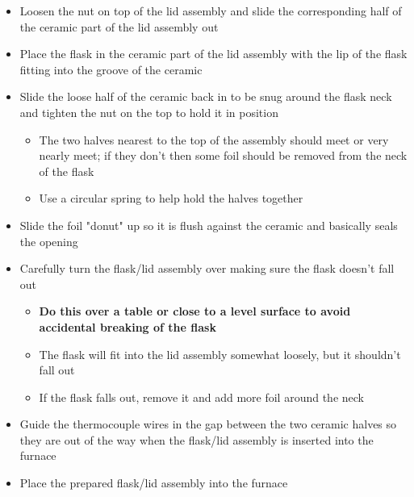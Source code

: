\documentclass[letterpaper,11pt]{article}
\begin{document}
\begin{itemize}
\begin{itemize}
        \item Loosen the nut on top of the lid assembly and slide the 
            corresponding half of the ceramic part of the lid assembly out
        \item Place the flask in the ceramic part of the lid assembly with the 
            lip of the flask fitting into the groove of the ceramic
        \item Slide the loose half of the ceramic back in to be snug 
            around the flask neck and tighten the nut on the top to hold it
            in position
                
                \begin{itemize}
                \item The two halves nearest to the top of the assembly should 
                    meet or very nearly meet; if they don't then some 
                    foil should be removed from the neck of the flask
                \item Use a circular spring to help hold the halves together
                \end{itemize}
                
        \item Slide the foil "donut" up so it is flush against the ceramic and 
            basically seals the opening
        \item Carefully turn the flask/lid assembly over making sure the flask 
            doesn't fall out
            
                \begin{itemize}
                \item \textbf{Do this over a table or close to a level surface 
                    to avoid accidental breaking of the flask}
                \item The flask will fit into the lid assembly somewhat loosely, 
                    but it shouldn't fall out
                \item If the flask falls out, remove it and add more foil 
                around the neck
                \end{itemize}
                
        \item Guide the thermocouple wires in the gap between the two ceramic 
            halves so they are out of the way when the flask/lid assembly is 
            inserted into the furnace
        \item Place the prepared flask/lid assembly into the furnace
        \end{itemize}
            

\end{itemize}
\end{document}
